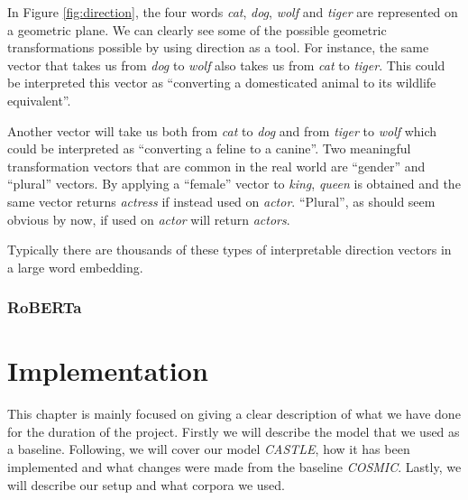 \documentclass[nofilelist]{cslthse-msc}
\begin{document}
In Figure \ref{fig:direction}, the four words \textit{cat}, \textit{dog}, \textit{wolf} and \textit{tiger} are represented on a geometric plane. We can clearly see some of the possible geometric transformations possible by using direction as a tool. For instance, the same vector that takes us from \textit{dog} to \textit{wolf} also takes us from \textit{cat} to \textit{tiger}. This could be interpreted this vector as ``converting a domesticated animal to its wildlife equivalent''. 

Another vector will take us both from \textit{cat} to \textit{dog} and from \textit{tiger} to \textit{wolf} which could be interpreted as ``converting a feline to a canine''. Two meaningful transformation vectors that are common in the real world are ``gender'' and ``plural'' vectors. By applying a ``female'' vector to \textit{king}, \textit{queen} is obtained and the same vector returns \textit{actress} if instead used on \textit{actor}. ``Plural'', as should seem obvious by now, if used on \textit{actor} will return \textit{actors}. 

Typically there are thousands of these types of interpretable direction vectors in a large word embedding.

\subsection{RoBERTa}













\chapter{Implementation}
This chapter is mainly focused on giving a clear description of what we have done for the duration of the project. Firstly we will describe the model that we used as a baseline. Following, we will cover our model \textit{CASTLE}, how it has been implemented and what changes were made from the baseline \textit{COSMIC}. Lastly, we will describe our setup and what corpora we used. 
\end{document}
